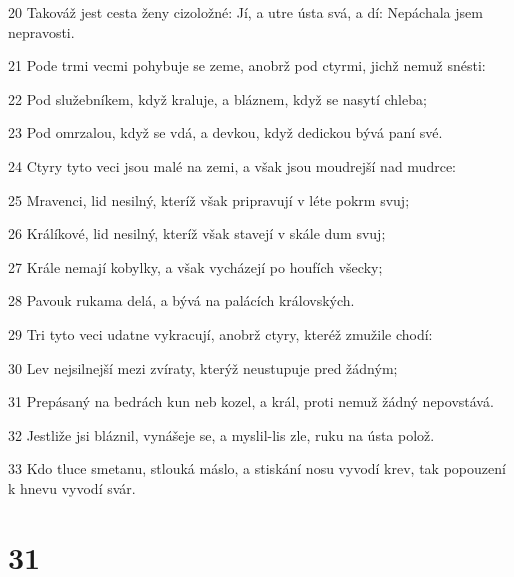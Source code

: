 \par 20 Takováž jest cesta ženy cizoložné: Jí, a utre ústa svá, a dí: Nepáchala jsem nepravosti.
\par 21 Pode trmi vecmi pohybuje se zeme, anobrž pod ctyrmi, jichž nemuž snésti:
\par 22 Pod služebníkem, když kraluje, a bláznem, když se nasytí chleba;
\par 23 Pod omrzalou, když se vdá, a devkou, když dedickou bývá paní své.
\par 24 Ctyry tyto veci jsou malé na zemi, a však jsou moudrejší nad mudrce:
\par 25 Mravenci, lid nesilný, kteríž však pripravují v léte pokrm svuj;
\par 26 Králíkové, lid nesilný, kteríž však stavejí v skále dum svuj;
\par 27 Krále nemají kobylky, a však vycházejí po houfích všecky;
\par 28 Pavouk rukama delá, a bývá na palácích královských.
\par 29 Tri tyto veci udatne vykracují, anobrž ctyry, kteréž zmužile chodí:
\par 30 Lev nejsilnejší mezi zvíraty, kterýž neustupuje pred žádným;
\par 31 Prepásaný na bedrách kun neb kozel, a král, proti nemuž žádný nepovstává.
\par 32 Jestliže jsi bláznil, vynášeje se, a myslil-lis zle, ruku na ústa polož.
\par 33 Kdo tluce smetanu, stlouká máslo, a stiskání nosu vyvodí krev, tak popouzení k hnevu vyvodí svár.

\chapter{31}

